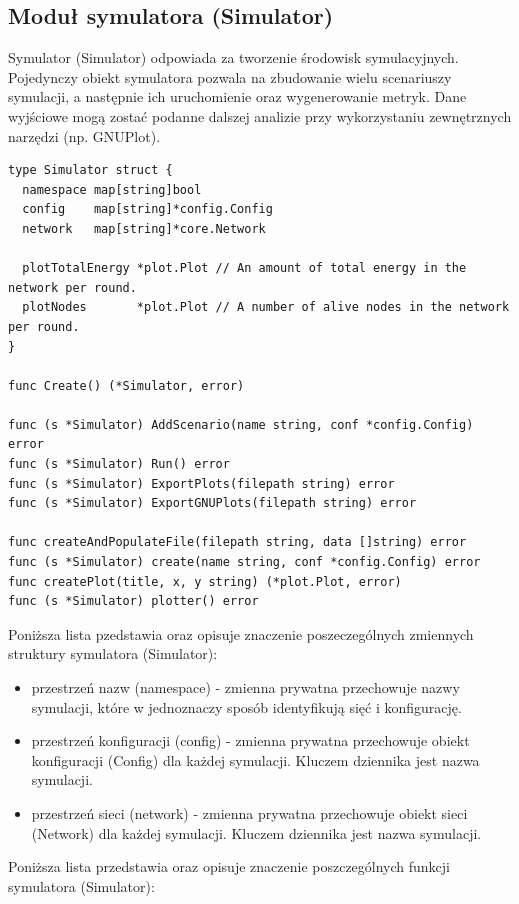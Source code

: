\documentclass[a4paper,12pt,twoside,openany]{report}
\begin{document}
\subsection{Moduł symulatora (Simulator)}

Symulator (Simulator) odpowiada za tworzenie środowisk symulacyjnych.
Pojedynczy obiekt symulatora pozwala na zbudowanie wielu scenariuszy symulacji, a następnie ich uruchomienie oraz
wygenerowanie metryk. Dane wyjściowe mogą zostać podanne dalszej analizie przy wykorzystaniu zewnętrznych narzędzi (np. GNUPlot).

\begin{lstlisting}
type Simulator struct {
  namespace map[string]bool
  config    map[string]*config.Config
  network   map[string]*core.Network

  plotTotalEnergy *plot.Plot // An amount of total energy in the network per round.
  plotNodes       *plot.Plot // A number of alive nodes in the network per round.
}

func Create() (*Simulator, error)

func (s *Simulator) AddScenario(name string, conf *config.Config) error
func (s *Simulator) Run() error
func (s *Simulator) ExportPlots(filepath string) error
func (s *Simulator) ExportGNUPlots(filepath string) error

func createAndPopulateFile(filepath string, data []string) error
func (s *Simulator) create(name string, conf *config.Config) error
func createPlot(title, x, y string) (*plot.Plot, error)
func (s *Simulator) plotter() error
\end{lstlisting}

Poniższa lista pzedstawia oraz opisuje znaczenie poszeczególnych zmiennych struktury symulatora (Simulator):

\begin{itemize}
 \item przestrzeń nazw (namespace) - zmienna prywatna przechowuje nazwy symulacji, które w jednoznaczy sposób identyfikują sięć i konfigurację.
 \item przestrzeń konfiguracji (config) - zmienna prywatna przechowuje obiekt konfiguracji (Config) dla każdej symulacji. Kluczem dziennika jest nazwa symulacji.
 \item przestrzeń sieci (network) - zmienna prywatna przechowuje obiekt sieci (Network) dla każdej symulacji. Kluczem dziennika jest nazwa symulacji.
\end{itemize}

Poniższa lista przedstawia oraz opisuje znaczenie poszczególnych funkcji symulatora (Simulator):
\end{document}
